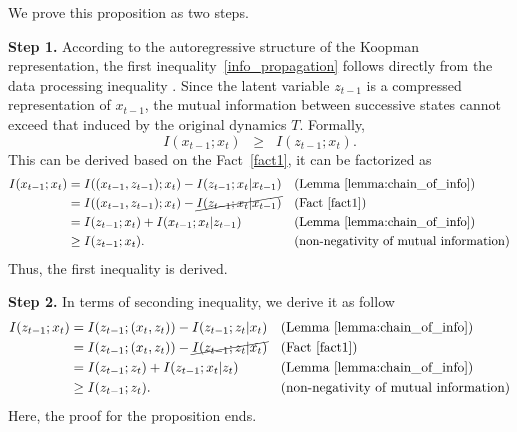 \documentclass{article} %
\begin{document}
\begin{proofwithframe}
We prove this proposition as two steps. 

\textbf{Step 1.} According to the autoregressive structure of the Koopman representation, the first inequality~\ref{info_propagation} follows directly from the data processing inequality \citep{stone2024information}. Since the latent variable $z_{t-1}$ is a compressed representation of $x_{t-1}$, the mutual information between successive states cannot exceed that induced by the original dynamics $T$. Formally,
\begin{equation}
    I(x_{t-1}; x_t) \;\;\ge\;\; I(z_{t-1}; x_t). 
\end{equation}
This can be derived based on the Fact~\ref{fact1}, it can be factorized as 
\begin{equation} \label{eq:factorize_original_info}
\begin{aligned}
        I(x_{t-1}; x_t) & = I((x_{t-1},z_{t-1}); x_t) - I(z_{t-1}; x_t|x_{t-1})  && \text{(Lemma~\ref{lemma:chain_of_info})} \\
        & =  I((x_{t-1},z_{t-1}); x_t) - \cancel{I(z_{t-1}; x_t|x_{t-1})} && \text{(Fact~\ref{fact1})} \\
         & =  I(z_{t-1}; x_t) + I(x_{t-1}; x_t|z_{t-1})  && \text{(Lemma~\ref{lemma:chain_of_info})} \\
         & \geq I(z_{t-1}; x_t). && \text{(non-negativity of mutual information)}
\end{aligned}
\end{equation}
Thus, the first inequality is derived. 

\textbf{Step 2.} In terms of seconding inequality, we derive it as follow
\begin{equation} \label{eq:factorize_z_x}
\begin{aligned}
        I(z_{t-1};x_t) & = I(z_{t-1};(x_t,z_t)) - I( z_{t-1}; z_t |x_t)     && \text{(Lemma~\ref{lemma:chain_of_info})} \\
        & = I(z_{t-1};(x_t,z_t)) - \cancel{I( z_{t-1}; z_t |x_t)} && \text{(Fact~\ref{fact1})} \\
        & = I(z_{t-1}; z_t) + I(z_{t-1}; x_t | z_{t}) && \text{(Lemma~\ref{lemma:chain_of_info})} \\
        & \geq I(z_{t-1}; z_t). && \text{(non-negativity of mutual information)}
\end{aligned}
\end{equation}
Here, the proof for the proposition ends. 
\end{proofwithframe}
\end{document}
